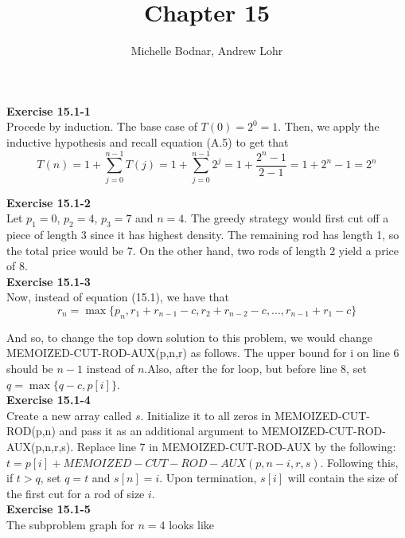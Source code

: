\documentclass{article}
\title{Chapter 15}
\author{Michelle Bodnar, Andrew Lohr}
\begin{document}
\maketitle

\noindent\textbf{Exercise 15.1-1}\\

Procede by induction. The base case of $T(0) = 2^0 = 1$. Then, we apply the inductive hypothesis and recall equation (A.5) to get that
\[
T(n) = 1+ \sum_{j=0}^{n-1} T(j) = 1+  \sum_{j=0}^{n-1} 2^j = 1 + \frac{2^{n}-1}{2-1} = 1+ 2^n-1 = 2^n
\]

\noindent\textbf{Exercise 15.1-2}\\

Let $p_1 = 0$, $p_2 = 4$, $p_3 = 7$ and $n=4$.  The greedy strategy would first cut off a piece of length 3 since it has highest density.  The remaining rod has length 1, so the total price would be 7. On the other hand, two rods of length 2 yield a price of 8. \\


\noindent\textbf{Exercise 15.1-3}\\

Now, instead of equation (15.1), we have that
\[
r_n = \max\{p_n,r_1+r_{n-1}-c,r_2+r_{n-2}-c,\ldots,r_{n-1}+r_{1}-c\}
\]

And so, to change the top down solution to this problem, we would change MEMOIZED-CUT-ROD-AUX(p,n,r) as follows. The upper bound for i on line 6 should be $n-1$ instead of $n$.Also, after the for loop, but before line 8, set $q = \max\{q-c,p[i]\}$.\\

\noindent\textbf{Exercise 15.1-4}\\

Create a new array called $s$.  Initialize it to all zeros in MEMOIZED-CUT-ROD(p,n) and pass it as an additional argument to MEMOIZED-CUT-ROD-AUX(p,n,r,s).  Replace line 7 in MEMOIZED-CUT-ROD-AUX by the following: $t = p[i] + MEMOIZED-CUT-ROD-AUX(p,n-i,r,s)$.  Following this, if $t > q$, set $q=t$ and $s[n] = i$. Upon termination, $s[i]$ will contain the size of the first cut for a rod of size $i$.  \\


\noindent\textbf{Exercise 15.1-5}\\

The subproblem graph for $n=4$ looks like

\end{document}
